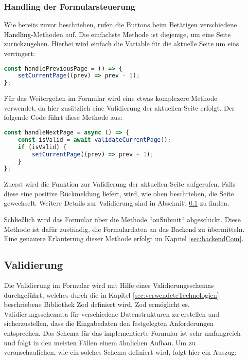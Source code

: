 \subsubsection{Handling der Formularsteuerung}
\label{sec:handlingFormularsytem}

Wie bereits zuvor beschrieben, rufen die Buttons beim Betätigen verschiedene Handling-Methoden auf. Die einfachste Methode ist diejenige, um eine Seite zurückzugehen. Hierbei wird einfach die Variable für die aktuelle Seite um eins verringert:

\begin{lstlisting}[language=JavaScript]
const handlePreviousPage = () => {
    setCurrentPage((prev) => prev - 1);
};
\end{lstlisting}

\newpage

Für das Weitergehen im Formular wird eine etwas komplexere Methode verwendet, da hier zusätzlich eine Validierung der aktuellen Seite erfolgt. Der folgende Code führt diese Methode aus:

\begin{lstlisting}[language=JavaScript]
const handleNextPage = async () => {
    const isValid = await validateCurrentPage();
    if (isValid) {
        setCurrentPage((prev) => prev + 1);
    }
};
\end{lstlisting}
Zuerst wird die Funktion zur Validierung der aktuellen Seite aufgerufen. Falls diese eine positive Rückmeldung liefert, wird, wie oben beschrieben, die Seite gewechselt. Weitere Details zur Validierung sind in Abschnitt \ref{sec:validierung} zu finden.

Schließlich wird das Formular über die Methode ``onSubmit`` abgeschickt. Diese Methode ist dafür zuständig, die Formulardaten an das Backend zu übermitteln. Eine genauere Erläuterung dieser Methode erfolgt im Kapitel \ref{sec:backendCom}.

\subsection{Validierung}
\label{sec:validierung}
Die Validierung im Formular wird mit Hilfe eines Validierungsschemas durchgeführt, welches durch die in Kapitel \ref{sec:verwendeteTechnologien} beschriebene Bibliothek Zod definiert wird. Zod ermöglicht es, Validierungsschemata für verschiedene Datenstrukturen zu erstellen und sicherzustellen, dass die Eingabedaten den festgelegten Anforderungen entsprechen. Das Schema für das implementierte Formular ist sehr umfangreich und folgt in den meisten Fällen einem ähnlichen Aufbau. Um zu veranschaulichen, wie ein solches Schema definiert wird, folgt hier ein Auszug:

